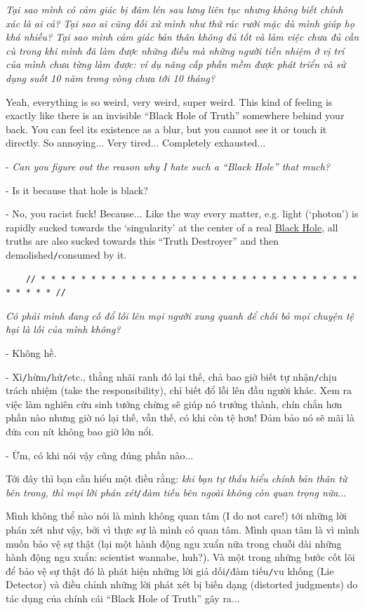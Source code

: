 \documentclass[12pt]{article}
\begin{document}
{\it Tại sao mình có cảm giác bị đâm lén sau lưng liên tục nhưng không biết chính xác là ai cả? Tại sao ai cũng đối xử mình như thứ rác rưởi mặc dù mình giúp họ khá nhiều? Tại sao mình cảm giác bản thân không đủ tốt và làm việc chưa đủ cần cù trong khi mình đã làm được những điều mà những người tiền nhiệm ở vị trí của mình chưa từng làm được: ví dụ nâng cấp phần mềm được phát triển và sử dụng suốt 10 năm trong vòng chưa tới 10 tháng?}

Yeah, everything is so weird, very weird, super weird. This kind of feeling is exactly like there is an invisible ``Black Hole of Truth'' somewhere behind your back. You can feel its existence as a blur, but you cannot see it or touch it directly. So annoying$\ldots$ Very tired$\ldots$ Completely exhausted$\ldots$

- {\it Can you figure out the reason why I hate such a ``Black Hole'' that much?}

- Is it because that hole is black?

- No, you racist fuck! Because$\ldots$ Like the way every matter, e.g. light (`photon') is rapidly sucked towards the `singularity' at the center of a real \href{https://en.wikipedia.org/wiki/Black_hole}{Black Hole}, all truths are also sucked towards this ``Truth Destroyer'' and then demolished{\tt/}consumed by it.

\begin{verbatim}
	// * * * * * * * * * * * * * * * * * * * * * * * * * * * * * * * * * * * * * //
\end{verbatim}

\noindent
{} {\it Có phải mình đang cố đổ lỗi lên mọi người xung quanh để chối bỏ mọi chuyện tệ hại là lỗi của mình không?}

- Không hề.

- Xì{\tt/}hừm{\tt/}hứ{\tt/}etc., thằng nhãi ranh đó lại thế, chả bao giờ biết tự nhận{\tt/}chịu trách nhiệm (take the responsibility), chỉ biết đổ lỗi lên đầu người khác. Xem ra việc làm nghiên cứu sinh tưởng chừng sẽ giúp nó trưởng thành, chín chắn hơn phần nào nhưng giờ nó lại thế, vẫn thế, có khi còn tệ hơn! Đảm bảo nó sẽ mãi là đứa con nít không bao giờ lớn nổi.

- Ừm, có khi nói vậy cũng đúng phần nào$\ldots$

Tới đây thì bạn cần hiểu một điều rằng: {\it khi bạn tự thấu hiểu chính bản thân từ bên trong, thì mọi lời phán xét{\tt/}đàm tiếu bên ngoài không còn quan trọng nữa}$\ldots$

Mình không thể nào nói là mình không quan tâm (I do not care!) tới những lời phán xét như vậy, bởi vì thực sự là mình có quan tâm. Mình quan tâm là vì mình muốn bảo vệ sự thật (lại một hành động ngu xuẩn nữa trong chuỗi dài những hành động ngu xuẩn: scientist wannabe, huh?). Và một trong những bước cốt lõi để bảo vệ sự thật đó là phát hiện những lời giả dối{\tt/}đàm tiếu{\tt/}vu khống (Lie Detector) và điều chỉnh những lời phát xét bị biến dạng (distorted judgments) do tác dụng của chính cái ``Black Hole of Truth'' gây ra$\ldots$
\end{document}
